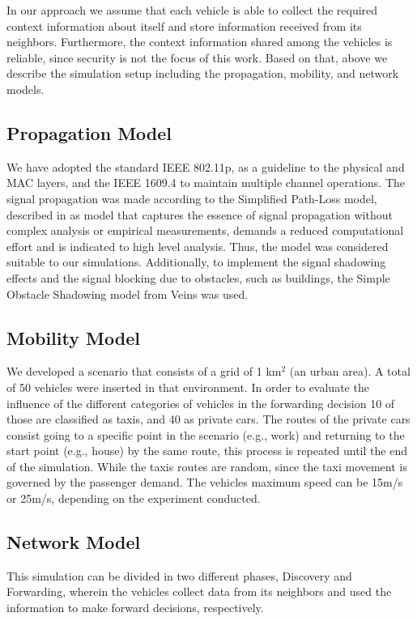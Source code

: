 \documentclass[conference]{IEEEtran}
\begin{document}
In our approach we assume that each vehicle is able to collect the required context information about itself and store information received from its neighbors. Furthermore, the context information shared among the vehicles is reliable, since security is not the focus of this work. Based on that, above we describe the simulation setup including the propagation, mobility, and network models.

\subsection{Propagation Model}

We have adopted the standard IEEE 802.11p, as a guideline to the physical and MAC layers, and the IEEE 1609.4 to maintain multiple channel operations. The signal propagation was made according to the Simplified Path-Loss model, described in \cite{tse2005} as model that captures the essence of signal propagation without complex analysis or empirical  measurements, demands a reduced computational effort and is indicated to high level analysis. Thus, the model was considered suitable to our simulations. Additionally, to implement the signal shadowing effects and the signal blocking due to obstacles, such as buildings, the Simple Obstacle Shadowing model from Veins was used.


\subsection{Mobility Model} 

We developed a scenario that consists of a grid of 1 km$^2$ (an urban area). A total of 50 vehicles were inserted in that environment. In order to evaluate the influence of the different categories of vehicles in the forwarding decision 10 of those are classified as taxis, and 40 as private cars. The routes of the private cars consist going to a specific point in the scenario (e.g., work) and returning to the start point (e.g., house) by the same route, this process is repeated until the end of the simulation. While the taxis routes are random, since the taxi movement is governed by the passenger demand. The vehicles maximum speed can be 15m/s or 25m/s, depending on the experiment conducted.

\subsection{Network Model}

 This simulation can be divided in two different phases, Discovery and Forwarding, wherein the vehicles collect data from its neighbors and used the information to make forward decisions, respectively.
\end{document}

